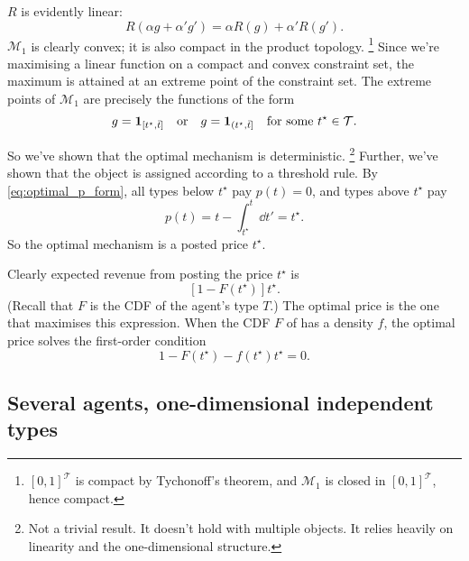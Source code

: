 \documentclass[11pt,letterpaper,reqno,oneside]{article}
\begin{document}
$R$ is evidently linear:
%
\begin{equation*}
	R( \alpha g + \alpha' g' ) = \alpha R(g) + \alpha' R(g') .
\end{equation*}
%
$\mathcal{M}_1$ is clearly convex; it is also compact in the product topology.%
	\footnote{$[0,1]^\mathcal{T}$ is compact by Tychonoff's theorem, and $\mathcal{M}_1$ is closed in $[0,1]^\mathcal{T}$, hence compact.}
Since we're maximising a linear function on a compact and convex constraint set, the maximum is attained at an extreme point of the constraint set. The extreme points of $\mathcal{M}_1$ are precisely the functions of the form
%
\begin{equation*}
	g = \boldsymbol{1}_{\left[t^\star,\bar{t}\right]}
	\quad\text{or}\quad
	g = \boldsymbol{1}_{\left(t^\star,\bar{t}\right]} 
	\quad\text{for some $t^\star \in \mathcal{T}$}.
\end{equation*}

So we've shown that the optimal mechanism is deterministic.%
	\footnote{Not a trivial result. It doesn't hold with multiple objects. It relies heavily on linearity and the one-dimensional structure.}
Further, we've shown that the object is assigned according to a threshold rule. By \eqref{eq:optimal_p_form}, all types below $t^\star$ pay $p(t)=0$, and types above $t^\star$ pay
%
\begin{equation*}
	p(t) 
	= t - \int_{t^\star}^t \dd t' 
	= t^\star .
\end{equation*}
%
So the optimal mechanism is a posted price $t^\star$.

Clearly expected revenue from posting the price $t^\star$ is
%
\begin{equation*}
	\left[ 1 - F\left( t^\star \right) \right] t^\star .
\end{equation*}
%
(Recall that $F$ is the CDF of the agent's type $T$.) The optimal price is the one that maximises this expression. When the CDF $F$ of has a density $f$, the optimal price solves the first-order condition
%
\begin{equation*}
	1 - F\left( t^\star \right) - f\left( t^\star \right) t^\star = 0 .
\end{equation*}



\pagebreak
\subsection{Several agents, one-dimensional independent types}
\label{sec:mech_desi:several_agents_one_dimension}
\end{document}
